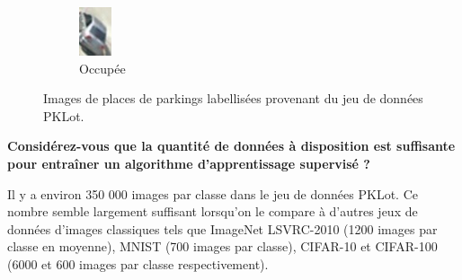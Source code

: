 \documentclass[12pt]{article}
\begin{document}
\begin{figure}[htbp]
\begin{subfigure}{0.2\textwidth}
        \includegraphics[width=\textwidth]{figures/datasets/2013-01-29_18_46_21_021.jpg}
        \caption{Occupée}
    \end{subfigure}
    \caption{Images de places de parkings labellisées provenant du jeu de données PKLot.}
    \label{fig:pklot_individual}
\end{figure}

\textbf{Considérez-vous que la quantité de données à disposition est suffisante pour entraîner un algorithme d'apprentissage supervisé ?}

Il y a environ 350 000 images par classe dans le jeu de données PKLot. Ce nombre semble largement suffisant lorsqu'on le compare à d'autres jeux de données d'images classiques tels que ImageNet LSVRC-2010 \citep{ILSVRC15} (1200 images par classe en moyenne), MNIST \citep{deng2012mnist} (700 images par classe), CIFAR-10 et CIFAR-100 \citep{Krizhevsky09learningmultiple} (6000 et 600 images par classe respectivement).
\end{document}
